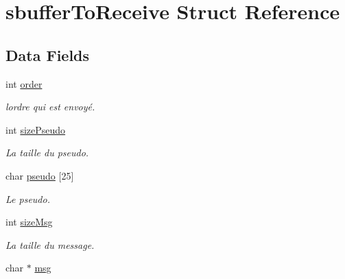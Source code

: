 \hypertarget{structsbuffer_to_receive}{}\section{sbuffer\+To\+Receive Struct Reference}
\label{structsbuffer_to_receive}
\subsection*{Data Fields}
\begin{DoxyCompactItemize}
\item 
\hypertarget{group__serveur_gac85d5511fdb8d162a7278bfb440ae420}{}int \hyperlink{group__serveur_gac85d5511fdb8d162a7278bfb440ae420}{order}\label{group__serveur_gac85d5511fdb8d162a7278bfb440ae420}

\begin{DoxyCompactList}\small\item\em l\textquotesingle{}ordre qui est envoyé. \end{DoxyCompactList}\item 
\hypertarget{group__serveur_gaa87948d9c54a8842c13b61ed4db35092}{}int \hyperlink{group__serveur_gaa87948d9c54a8842c13b61ed4db35092}{size\+Pseudo}\label{group__serveur_gaa87948d9c54a8842c13b61ed4db35092}

\begin{DoxyCompactList}\small\item\em La taille du pseudo. \end{DoxyCompactList}\item 
\hypertarget{group__serveur_gae6cc99604162931ab8baf652f1a03682}{}char \hyperlink{group__serveur_gae6cc99604162931ab8baf652f1a03682}{pseudo} \mbox{[}25\mbox{]}\label{group__serveur_gae6cc99604162931ab8baf652f1a03682}

\begin{DoxyCompactList}\small\item\em Le pseudo. \end{DoxyCompactList}\item 
\hypertarget{group__serveur_ga34dfc3a88b9ef77937198ba611f28f69}{}int \hyperlink{group__serveur_ga34dfc3a88b9ef77937198ba611f28f69}{size\+Msg}\label{group__serveur_ga34dfc3a88b9ef77937198ba611f28f69}

\begin{DoxyCompactList}\small\item\em La taille du message. \end{DoxyCompactList}\item 
\hypertarget{group__serveur_ga32d2f5216cddb59c7cc8fb2806a7e727}{}char $\ast$ \hyperlink{group__serveur_ga32d2f5216cddb59c7cc8fb2806a7e727}{msg}\label{group__serveur_ga32d2f5216cddb59c7cc8fb2806a7e727}


\end{DoxyCompactItemize}
